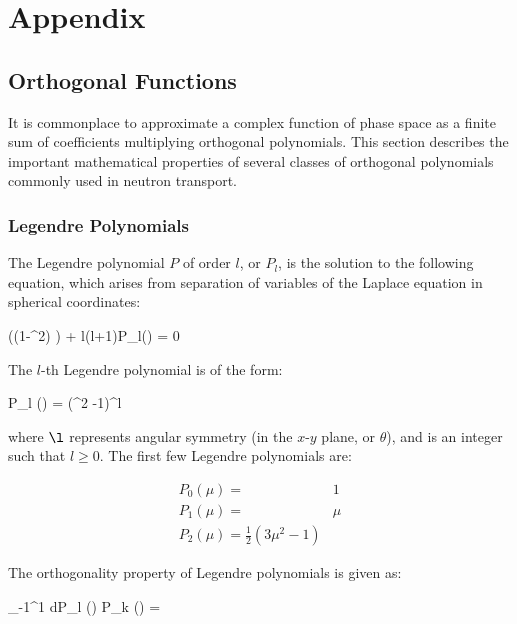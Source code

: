 \section{Appendix}
\label{sec:Appendix}

\subsection{Orthogonal Functions}

It is commonplace to approximate a complex function of phase space as a finite sum of coefficients multiplying orthogonal polynomials. This section describes the important mathematical properties of several classes of orthogonal polynomials commonly used in neutron transport.

\subsubsection{Legendre Polynomials}
\label{sec:LegendrePolynomials}
The Legendre polynomial \(P\) of order \(l\), or \(P_l\), is the solution to the following equation, which arises from separation of variables of the Laplace equation in spherical coordinates:

\beq
\label{eq:LegendrePolynomialDiffEq}
 \left((1-\mu^2) \right) + l(l+1)P_l(\mu) = 0
\eeq

The \(l\)-th Legendre polynomial is of the form:

\beq
\label{eq:LegendrePolynomialDefinitions}
P_l (\mu) =   \left(\mu^2 -1\right)^l
\eeq

where \(\l\) represents angular symmetry (in the \(x\)-\(y\) plane, or \(\theta\)), and is an integer such that \(l\geq0\). The first few Legendre polynomials are:

\begin{subequations}
\label{eqn:LegendrePolynomials_P0P1P2}
\begin{eqnarray}
 P_0 (\mu) =& 1\\
 P_1 (\mu) =& \mu\\
 P_2 (\mu) = \frac{1}{2} (3\mu^2 -1)
\end{eqnarray}
\end{subequations}

The orthogonality property of Legendre polynomials is given as:

\beq
\label{eqn:LegendrePolynomialsOrthogonality}
\int_{-1}^{1} d\mu P_l (\mu) P_k (\mu) = 
\eeq


